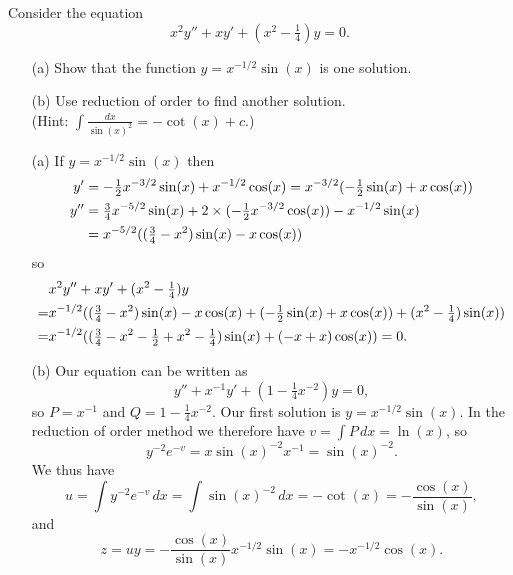 \documentclass[a4paper]{amsart}
\begin{document}
\begin{exercise}\label{ex-reduction-a}
 Consider the equation
 \[ x^2y'' + xy' + (x^2-\tfrac{1}{4})y = 0. \]
 \begin{itemize}
  \item[(a)] Show that the function $y=x^{-1/2}\sin(x)$ is one solution.
  \item[(b)] Use reduction of order to find another solution.\\
   (Hint: $\int\frac{dx}{\sin(x)^2}=-\cot(x)+c$.)
 \end{itemize}
\end{exercise}
\begin{solution}\leavevmode
 \begin{itemize}
  \item[(a)] If $y=x^{-1/2}\sin(x)$ then
   \begin{align*}
    y' &= -\tfrac{1}{2}x^{-3/2}\sin(x) + x^{-1/2}\cos(x) 
        = x^{-3/2}(-\tfrac{1}{2}\sin(x)+x\cos(x)) \\
    y'' &= \tfrac{3}{4}x^{-5/2}\sin(x) +
            2 \times(-\tfrac{1}{2}x^{-3/2}\cos(x)) -
            x^{-1/2} \sin(x) \\
        &= x^{-5/2}((\tfrac{3}{4}-x^2)\sin(x) - x\cos(x))
   \end{align*}
   so
   \begin{align*}
     & x^2y'' + xy' + (x^2-\tfrac{1}{4})y \\
    =& x^{-1/2}((\tfrac{3}{4}-x^2)\sin(x) - x\cos(x) +
                (-\tfrac{1}{2}\sin(x)+x\cos(x)) + 
                (x^2-\tfrac{1}{4})\sin(x)) \\
    =& x^{-1/2}((\tfrac{3}{4}-x^2-\tfrac{1}{2}+x^2-\tfrac{1}{4})\sin(x) + 
                (-x+x)\cos(x)) = 0.
   \end{align*}
  \item[(b)] Our equation can be written as
   \[ y'' + x^{-1}y' + (1-\tfrac{1}{4}x^{-2})y = 0, \]
   so $P=x^{-1}$ and $Q=1-\tfrac{1}{4}x^{-2}$.  Our first solution is
   $y=x^{-1/2}\sin(x)$.  In the reduction of
   order method we therefore have $v=\int P\,dx=\ln(x)$, so 
   \[ y^{-2}e^{-v} = x\sin(x)^{-2}x^{-1} = \sin(x)^{-2}. \]
   We thus have 
   \[ u=\int y^{-2}e^{-v}\,dx = \int \sin(x)^{-2}\,dx = -\cot(x)
       = -\frac{\cos(x)}{\sin(x)},
   \]
   and 
   \[ z = uy = -\frac{\cos(x)}{\sin(x)}x^{-1/2}\sin(x) 
        = -x^{-1/2}\cos(x).
   \]
 \end{itemize}
\end{solution}
\end{document}
